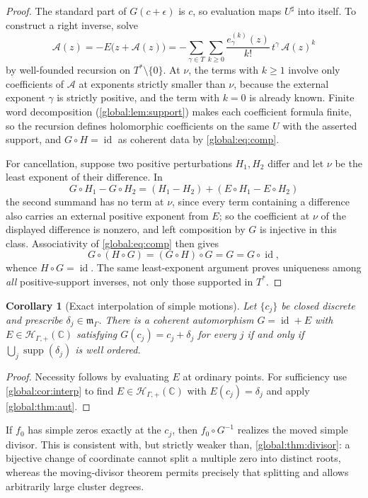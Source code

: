 \documentclass[11pt,letterpaper]{article}
\newtheorem{corollary}[corollary]{Corollary}
\theoremstyle{definition}
\theoremstyle{remark}
\newcommand{\C}{\mathbb C}
\newcommand{\HP}{\mathscr H_{\Gamma,+}}
\newcommand{\mK}{\mathfrak m_\Gamma}
\newcommand{\sh}{^{\sharp}}
\newcommand{\supp}{\operatorname{supp}}
\newcommand{\id}{\operatorname{id}}
\numberwithin{equation}{section}
\begin{document}
\begin{proof}
The standard part of $G(c+\epsilon)$ is $c$, so evaluation maps $U\sh$ into itself. To construct a right inverse, solve
\begin{equation}\label{global:eq:inverse-rec}
  \mathcal A(z)=-E\bigl(z+\mathcal A(z)\bigr)
  =-\sum_{\gamma\in T}\sum_{k\ge0}
  \frac{e_\gamma^{(k)}(z)}{k!}\,t^\gamma\,\mathcal A(z)^k
\end{equation}
by well-founded recursion on $T^*\setminus\{0\}$. At $\nu$, the terms with $k\ge1$ involve only coefficients of $\mathcal A$ at exponents strictly smaller than $\nu$, because the external exponent $\gamma$ is strictly positive, and the term with $k=0$ is already known. Finite word decomposition (\cref{global:lem:support}) makes each coefficient formula finite, so the recursion defines holomorphic coefficients on the same $U$ with the asserted support, and $G\circ H=\id$ as coherent data by \eqref{global:eq:comp}.

For cancellation, suppose two positive perturbations $H_1,H_2$ differ and let $\nu$ be the least exponent of their difference. In
\[
  G\circ H_1-G\circ H_2=(H_1-H_2)+(E\circ H_1-E\circ H_2)
\]
the second summand has no term at $\nu$, since every term containing a difference also carries an external positive exponent from $E$; so the coefficient at $\nu$ of the displayed difference is nonzero, and left composition by $G$ is injective in this class. Associativity of \eqref{global:eq:comp} then gives
\[
  G\circ(H\circ G)=(G\circ H)\circ G=G=G\circ\id,
\]
whence $H\circ G=\id$. The same least-exponent argument proves uniqueness among \emph{all} positive-support inverses, not only those supported in $T^*$.
\end{proof}

\begin{corollary}[Exact interpolation of simple motions]\label{global:cor:motion}
Let $\{c_j\}$ be closed discrete and prescribe $\delta_j\in\mK$. There is a coherent automorphism $G=\id+E$ with $E\in\HP(\C)$ satisfying $G(c_j)=c_j+\delta_j$ for every $j$ if and only if $\bigcup_j\supp(\delta_j)$ is well ordered.
\end{corollary}

\begin{proof}
Necessity follows by evaluating $E$ at ordinary points. For sufficiency use \cref{global:cor:interp} to find $E\in\HP(\C)$ with $E(c_j)=\delta_j$ and apply \cref{global:thm:aut}.
\end{proof}

If $f_0$ has simple zeros exactly at the $c_j$, then $f_0\circ G^{-1}$ realizes the moved simple divisor. This is consistent with, but strictly weaker than, \cref{global:thm:divisor}: a bijective change of coordinate cannot split a multiple zero into distinct roots, whereas the moving-divisor theorem permits precisely that splitting and allows arbitrarily large cluster degrees.
\end{document}
